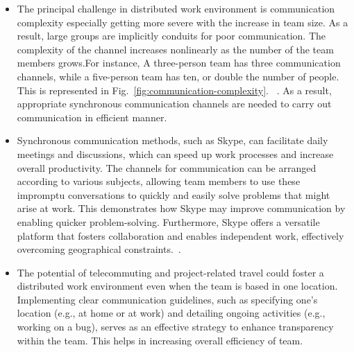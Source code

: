 \documentclass{llncs}
\begin{document}
\begin{itemize}
    \item The principal challenge in distributed work environment is  communication complexity especially getting more severe with the increase in team size. As a result, large groups are implicitly conduits for poor communication. The complexity of the channel increases nonlinearly as the number of the team members grows.For instance, A three-person team has three communication channels, while a five-person team has ten, or double the number of people. This is represented in Fig.~\ref{fig:communication-complexity}. ~\cite{refpaper7}. As a result, appropriate synchronous communication channels are needed to carry out communication in efficient manner.~\cite{refpaper7} \\ 
    \item Synchronous communication methods, such as Skype, can facilitate daily meetings and discussions, which can speed up work processes and increase overall productivity. The channels for communication can be arranged according to various subjects, allowing team members to use these impromptu conversations to quickly and easily solve problems that might arise at work. This demonstrates how Skype may improve communication by enabling quicker problem-solving. Furthermore, Skype offers a versatile platform that fosters collaboration and enables independent work, effectively overcoming geographical constraints.~\cite{refpaper8}. \\
    \item The potential of telecommuting and project-related travel could foster a distributed work environment even when the team is based in one location. Implementing clear communication guidelines, such as specifying one's location (e.g., at home or at work) and detailing ongoing activities (e.g., working on a bug), serves as an effective strategy to enhance transparency within the team. This helps in increasing overall efficiency of team.~\cite{refpaper8}
\end{itemize}
 
\end{document}
